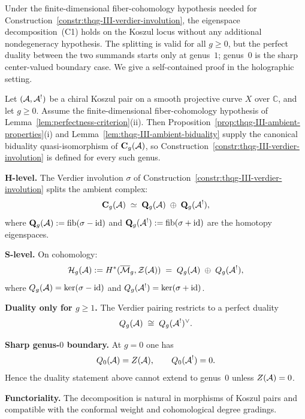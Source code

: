 Under the finite-dimensional fiber-cohomology hypothesis needed
for Construction~\ref{constr:thqg-III-verdier-involution}, the
eigenspace decomposition~(C1) holds on the Koszul locus without
any additional nondegeneracy hypothesis. The splitting is valid for
all $g \ge 0$, but the perfect duality between the two summands starts
only at genus~$1$; genus~$0$ is the sharp center-valued boundary case.
We give a self-contained proof in the holographic setting.

\begin{theorem}
\label{thm:thqg-III-eigenspace-decomposition}
Let $(\mathcal{A}, \mathcal{A}^!)$ be a chiral Koszul pair on a smooth projective
curve $X$ over $\mathbb{C}$, and let $g \ge 0$.
Assume the finite-dimensional fiber-cohomology hypothesis of
Lemma~\ref{lem:perfectness-criterion}(ii). Then
Proposition~\ref{prop:thqg-III-ambient-properties}(i) and
Lemma~\ref{lem:thqg-III-ambient-biduality} supply the canonical
biduality quasi-isomorphism of $\mathbf{C}_g(\mathcal{A})$, so
Construction~\ref{constr:thqg-III-verdier-involution} is defined
for every such genus.

\smallskip\noindent
\textbf{H-level.}\;
The Verdier involution $\sigma$ of
Construction~\textup{\ref{constr:thqg-III-verdier-involution}}
splits the ambient complex:
\begin{equation}\label{eq:thqg-III-C1-homotopy}
\mathbf{C}_g(\mathcal{A})
\;\simeq\;
\mathbf{Q}_g(\mathcal{A}) \;\oplus\; \mathbf{Q}_g(\mathcal{A}^!),
\end{equation}
where
$\mathbf{Q}_g(\mathcal{A}) := \operatorname{fib}(\sigma - \mathrm{id})$ and
$\mathbf{Q}_g(\mathcal{A}^!) := \operatorname{fib}(\sigma + \mathrm{id})$
are the homotopy eigenspaces.

\smallskip\noindent
\textbf{S-level.}\;
On cohomology:
\begin{equation}\label{eq:thqg-III-C1-shadow}
\mathcal{H}_g(\mathcal{A})
:= H^*(\overline{\mathcal{M}}_g, \mathcal{Z}(\mathcal{A}))
\;=\;
Q_g(\mathcal{A}) \;\oplus\; Q_g(\mathcal{A}^!),
\end{equation}
where $Q_g(\mathcal{A}) = \ker(\sigma - \mathrm{id})$ and
$Q_g(\mathcal{A}^!) = \ker(\sigma + \mathrm{id})$.

\smallskip\noindent
\textbf{Duality only for $g \ge 1$.}\;
The Verdier pairing restricts to a perfect duality
\begin{equation}\label{eq:thqg-III-C1-duality}
Q_g(\mathcal{A}) \;\cong\; Q_g(\mathcal{A}^!)^{\vee}.
\end{equation}

\smallskip\noindent
\textbf{Sharp genus-$0$ boundary.}\;
At $g = 0$ one has
\[
Q_0(\mathcal{A}) = Z(\mathcal{A}), \qquad Q_0(\mathcal{A}^!) = 0.
\]
Hence the duality statement above cannot extend to genus~$0$
unless $Z(\mathcal{A})=0$.

\smallskip\noindent
\textbf{Functoriality.}\;
The decomposition is natural in morphisms of Koszul pairs and
compatible with the conformal weight and cohomological degree
gradings.
\end{theorem}

